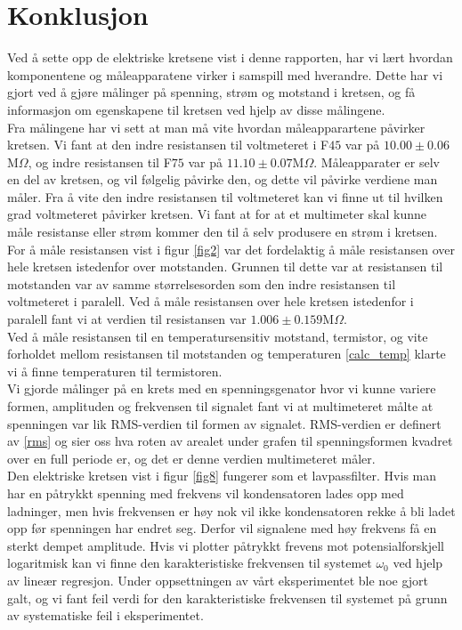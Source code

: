 \documentclass[%
 reprint,
 amsmath,amssymb,
 aps,
]{revtex4-1}
\begin{document}
\section{Konklusjon}
Ved å sette opp de elektriske kretsene vist i denne rapporten, har vi lært hvordan komponentene og måleapparatene virker i samspill med hverandre. Dette har vi gjort ved å gjøre målinger på spenning, strøm og motstand i kretsen, og få informasjon om egenskapene til kretsen ved hjelp av disse målingene. \\
Fra målingene har vi sett at man må vite hvordan måleapparartene påvirker kretsen. Vi fant at den indre resistansen til voltmeteret i F$45$ var på $10.00 \pm 0.06$M$\Omega$, og indre resistansen til F$75$ var på $11.10 \pm 0.07$M$\Omega$. Måleapparater er selv en del av kretsen, og vil følgelig påvirke den, og dette vil påvirke verdiene man måler. Fra å vite den indre resistansen til voltmeteret kan vi finne ut til hvilken grad voltmeteret påvirker kretsen. Vi fant at for at et multimeter skal kunne måle resistanse eller strøm kommer den til å selv produsere en strøm i kretsen. \\For å måle resistansen vist i figur \ref{fig2} var det fordelaktig å måle resistansen over hele kretsen istedenfor over motstanden. Grunnen til dette var at resistansen til motstanden var av samme størrelsesorden som den indre resistansen til voltmeteret i paralell. Ved å måle resistansen over hele kretsen istedenfor i paralell fant vi at verdien til resistansen var $1.006\pm0.159$M$\Omega$. \\
Ved å måle resistansen til en temperatursensitiv motstand, termistor, og vite forholdet mellom resistansen til motstanden og temperaturen \eqref{calc_temp} klarte vi å finne temperaturen til termistoren. \\
Vi gjorde målinger på en krets med en spenningsgenator hvor vi kunne variere formen, amplituden og frekvensen til signalet fant vi at multimeteret målte at spenningen var lik RMS-verdien til formen av signalet. RMS-verdien er definert av \eqref{rms} og sier oss hva roten av arealet under grafen til spenningsformen kvadret over en full periode er, og det er denne verdien multimeteret måler. \\
Den elektriske kretsen vist i figur \ref{fig8} fungerer som et lavpassfilter. Hvis man har en påtrykkt spenning med frekvens vil kondensatoren lades opp med ladninger, men hvis frekvensen er høy nok vil ikke kondensatoren rekke å bli ladet opp før spenningen har endret seg. Derfor vil signalene med høy frekvens få en sterkt dempet amplitude. Hvis vi plotter påtrykkt frevens mot potensialforskjell logaritmisk kan vi finne den karakteristiske frekvensen til systemet $\omega_0$ ved hjelp av lineær regresjon. Under oppsettningen av vårt eksperimentet ble noe gjort galt, og vi fant feil verdi for den karakteristiske frekvensen til systemet på grunn av systematiske feil i eksperimentet.
\end{document}
